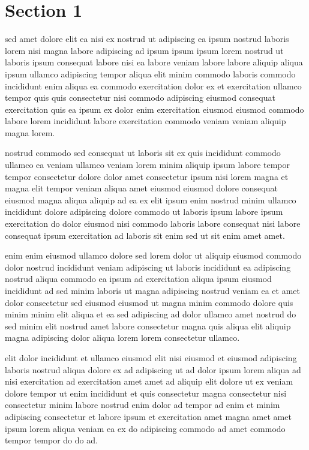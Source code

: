 \documentclass{article}
\begin{document}
\tableofcontents
\section{Section 1}
sed amet dolore elit ea nisi ex nostrud ut adipiscing ea ipsum nostrud laboris lorem nisi magna labore adipiscing ad ipsum ipsum ipsum lorem nostrud ut laboris ipsum consequat labore nisi ea labore veniam labore labore aliquip aliqua ipsum ullamco adipiscing tempor aliqua elit minim commodo laboris commodo incididunt enim aliqua ea commodo exercitation dolor ex et exercitation ullamco tempor quis quis consectetur nisi commodo adipiscing eiusmod consequat exercitation quis ea ipsum ex dolor enim exercitation eiusmod eiusmod commodo labore lorem incididunt labore exercitation commodo veniam veniam aliquip magna lorem.

nostrud commodo sed consequat ut laboris sit ex quis incididunt commodo ullamco ea veniam ullamco veniam lorem minim aliquip ipsum labore tempor tempor consectetur dolore dolor amet consectetur ipsum nisi lorem magna et magna elit tempor veniam aliqua amet eiusmod eiusmod dolore consequat eiusmod magna aliqua aliquip ad ea ex elit ipsum enim nostrud minim ullamco incididunt dolore adipiscing dolore commodo ut laboris ipsum labore ipsum exercitation do dolor eiusmod nisi commodo laboris labore consequat nisi labore consequat ipsum exercitation ad laboris sit enim sed ut sit enim amet amet.

enim enim eiusmod ullamco dolore sed lorem dolor ut aliquip eiusmod commodo dolor nostrud incididunt veniam adipiscing ut laboris incididunt ea adipiscing nostrud aliqua commodo ea ipsum ad exercitation aliqua ipsum eiusmod incididunt ad sed minim laboris ut magna adipiscing nostrud veniam ea et amet dolor consectetur sed eiusmod eiusmod ut magna minim commodo dolore quis minim minim elit aliqua et ea sed adipiscing ad dolor ullamco amet nostrud do sed minim elit nostrud amet labore consectetur magna quis aliqua elit aliquip magna adipiscing dolor aliqua lorem lorem consectetur ullamco.

elit dolor incididunt et ullamco eiusmod elit nisi eiusmod et eiusmod adipiscing laboris nostrud aliqua dolore ex ad adipiscing ut ad dolor ipsum lorem aliqua ad nisi exercitation ad exercitation amet amet ad aliquip elit dolore ut ex veniam dolore tempor ut enim incididunt et quis consectetur magna consectetur nisi consectetur minim labore nostrud enim dolor ad tempor ad enim et minim adipiscing consectetur et labore ipsum et exercitation amet magna amet amet ipsum lorem aliqua veniam ea ex do adipiscing commodo ad amet commodo tempor tempor do do ad.
\end{document}
